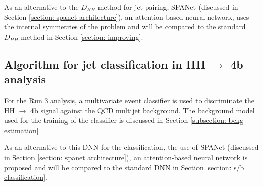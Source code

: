 As an alternative to the $D_{HH}$-method for jet pairing, SPANet (discussed in Section \ref{section: spanet architecture}), an attention-based neural network, uses the internal symmetries of the problem and will be compared to the standard $D_{HH}$-method in Section \ref{section: improving}.

\subsection{Algorithm for jet classification in HH $\to$ 4b analysis} \label{subsection: DNN}

For the Run 3 analysis, a multivariate event classifier is used to discriminate the HH $\to$ 4b signal against the QCD multijet background. The background model used for the training of the classifier is discussed in Section \ref{subsection: bckg estimation} \cite{ANRun3}. 

As an alternative to this DNN for the classification, the use of SPANet (discussed in Section \ref{section: spanet architecture}), an attention-based neural network is proposed and will be compared to the standard DNN in Section \ref{section: s/b classification}.
